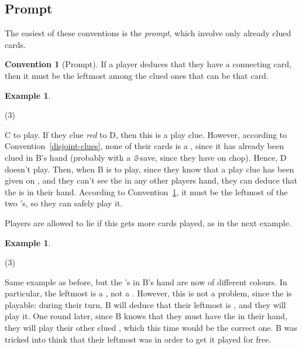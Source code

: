 \documentclass[a4paper]{article}
\theoremstyle{plain}
\theoremstyle{definition}
\newtheorem{example}[theorem]{Example}
\newtheorem{convention}[theorem]{Convention}
\begin{document}
\subsection{Prompt}

The easiest of these conventions is the \textit{prompt}, which involve only already clued cards.

\begin{convention}[Prompt]
	\label{prompt}
	If a player deduces that they have a connecting card, then it must be the leftmost among the clued ones that can be that card.
\end{convention}

\begin{example}
	\hfill
	\begin{tasks}(3)
		\task[+]      
		\task[A]    
		\task[B]    
		\task[C]    
		\task[D]    
		\task[E]    
	\end{tasks}
	
	C to play. If they clue \textit{red} to D, then this is a play clue. However, according to Convention~\ref{disjoint-clues}, none of their cards is a , since it has already been clued in B's hand (probably with a \textit{2}-save, since they have  on chop). Hence, D doesn't play. Then, when B is to play, since they know that a play clue has been given on , and they can't see the  in any other players hand, they can deduce that the  is in their hand. According to Convention~\ref{prompt}, it must be the leftmost of the two 's, so they can safely play it.
\end{example}

Players are allowed to lie if this gets more cards played, as in the next example.

\begin{example}
	\hfill
	\begin{tasks}(3)
		\task[+]      
		\task[A]    
		\task[B]    
		\task[C]    
		\task[D]    
		\task[E]    
	\end{tasks}
	
	Same example as before, but the 's in B's hand are now of different colours. In particular, the leftmost is a , not a . However, this is not a problem, since the  is playable: during their turn, B will deduce that their leftmost  is , and they will play it. One round later, since B knows that they must have the  in their hand, they will play their other clued , which this time would be the correct one. B was tricked into think that their leftmost  was  in order to get it played for free.
\end{example}
\end{document}
